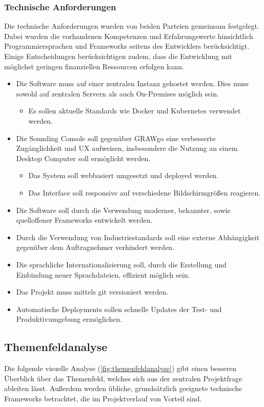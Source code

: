 \subsubsection{Technische Anforderungen}
Die technische Anforderungen wurden von beiden Parteien gemeinsam festgelegt.
Dabei wurden die vorhandenen Kompetenzen und Erfahrungswerte hinsichtlich Programmiersprachen und Frameworks seitens des Entwicklers berücksichtigt.
Einige Entscheidungen berücksichtigen zudem, dass die Entwicklung mit möglichst geringen finanziellen Ressourcen erfolgen kann.
\begin{itemize}
    \item Die Software muss auf einer zentralen Instanz gehostet werden. Dies muss sowohl auf zentralen Servern als auch On-Premises möglich sein.
    \begin{itemize}
        \item Es sollen aktuelle Standards wie Docker und Kubernetes verwendet werden.
    \end{itemize}
    \item Die Sounding Console soll gegenüber GRAWgo eine verbesserte Zugänglichkeit und UX aufweisen, insbesondere die Nutzung an einem Desktop Computer soll ermöglicht werden.
    \begin{itemize}
        \item Das System soll webbasiert umgesetzt und deployed werden.
        \item Das Interface soll responsive auf verschiedene Bildschirmgrößen reagieren.
    \end{itemize}
    \item Die Software soll durch die Verwendung moderner, bekannter, sowie quelloffener Frameworks entwickelt werden.
    \item Durch die Verwendung von Industriestandards soll eine externe Abhängigkeit gegenüber dem Auftragnehmer verhindert werden.
    \item Die sprachliche Internationalisierung soll, durch die Erstellung und Einbindung neuer Sprachdateien, effizient möglich sein.
    \item Das Projekt muss mittels git versioniert werden.
    \item Automatische Deployments sollen schnelle Updates der Test- und Produktivumgebung ermöglichen.
\end{itemize}

\subsection{Themenfeldanalyse}
Die folgende visuelle Analyse (\ref{fig:themenfeldanalyse}) gibt einen besseren Überblick über das Themenfeld, welches sich aus der zentralen Projektfrage ableiten lässt.
Außerdem werden übliche, grundsätzlich geeignete technische Frameworks betrachtet, die im Projektverlauf von Vorteil sind.

